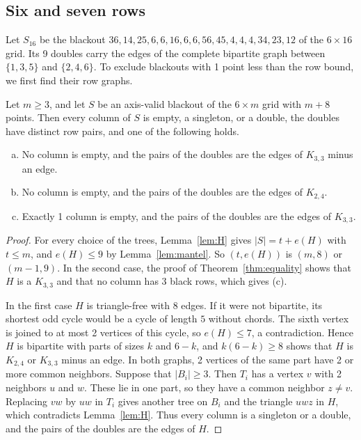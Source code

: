 \subsection{Six and seven rows}

Let $S_{16}$ be the blackout
$36,14,25,6,6,16,6,6,56,45,4,4,4,34,23,12$ of the $6\times16$ grid. Its 9 doubles carry the edges of the complete bipartite graph
between $\{1,3,5\}$ and $\{2,4,6\}$. To exclude blackouts with 1 point less than the row
bound, we first find their row graphs.

\begin{lemma}\label{lem:sixbelow}
Let $m\ge3$, and let $S$ be an axis-valid blackout of the $6\times m$ grid with $m+8$
points. Then every column of $S$ is empty, a singleton, or a double, the doubles have
distinct row pairs, and one of the following holds.
\begin{enumerate}[(a)]
\item No column is empty, and the pairs of the doubles are the edges of $K_{3,3}$ minus
an edge.
\item No column is empty, and the pairs of the doubles are the edges of $K_{2,4}$.
\item Exactly 1 column is empty, and the pairs of the doubles are the edges of $K_{3,3}$.
\end{enumerate}
\end{lemma}

\begin{proof}
For every choice of the trees, Lemma~\ref{lem:H} gives $|S|=t+e(H)$ with $t\le m$, and
$e(H)\le9$ by Lemma~\ref{lem:mantel}. So $(t,e(H))$ is $(m,8)$ or $(m-1,9)$. In the second
case, the proof of Theorem~\ref{thm:equality} shows that $H$ is a $K_{3,3}$ and that no
column has 3 black rows, which gives (c).

In the first case $H$ is triangle-free with 8 edges. If it were not bipartite, its shortest
odd cycle would be a cycle of length $5$ without chords. The sixth vertex is joined to at
most 2 vertices of this cycle, so $e(H)\le7$, a contradiction. Hence $H$ is bipartite with
parts of sizes $k$ and $6-k$, and $k(6-k)\ge8$ shows that $H$ is $K_{2,4}$ or $K_{3,3}$
minus an edge. In both graphs, 2 vertices of the same part have 2 or more common
neighbors. Suppose that $|B_i|\ge3$. Then $T_i$ has a vertex $v$ with 2 neighbors $u$ and
$w$. These lie in one part, so they have a common neighbor $z\ne v$. Replacing $vw$ by $uw$
in $T_i$ gives another tree on $B_i$ and the triangle $uwz$ in $H$, which contradicts
Lemma~\ref{lem:H}. Thus every column is a singleton or a double, and the pairs of the
doubles are the edges of $H$.
\end{proof}

